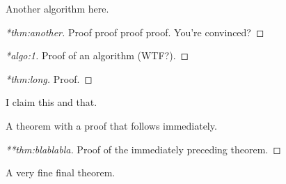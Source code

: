 \documentclass[%
  aps,%
  pra,%
  superscriptaddress,%
  reprint,%
  longbibliography,%
  nofootinbib,%
  notitlepage]{revtex4-2}
\begin{document}
\begin{algorithm}
  \label{algo:2}
  Another algorithm here.
\end{algorithm}

\cleardoublepage

\begin{proof}[*thm:another]
  Proof proof proof proof. You're convinced?
\end{proof}

\begin{proof}[*algo:1]
  Proof of an algorithm (WTF?).
\end{proof}

\begin{proof}[*thm:long]
  Proof.
\end{proof}

\begin{claim}
  I claim this and that.
\end{claim}

\cleardoublepage

\begin{theorem}
  \label{thm:blablabla}
  A theorem with a proof that follows immediately.
\end{theorem}
\begin{proof}[**thm:blablabla]
  Proof of the immediately preceding theorem.
\end{proof}


\begin{theorem}
  \label{x:backrefproof}
  A very fine final theorem.
\end{theorem}
\end{document}
